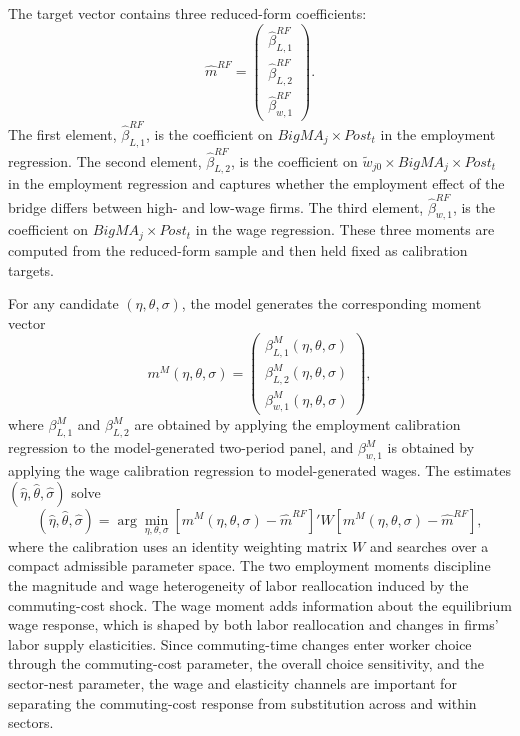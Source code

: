 \documentclass[12pt]{article}
\begin{document}
The target vector contains three reduced-form coefficients:
\begin{equation}
    \widehat{m}^{RF}
    =
    \begin{pmatrix}
        \widehat{\beta}^{RF}_{L,1} \\
        \widehat{\beta}^{RF}_{L,2} \\
        \widehat{\beta}^{RF}_{w,1}
    \end{pmatrix}.
    \label{eq:calibration_target_vector}
\end{equation}
The first element, \(\widehat{\beta}^{RF}_{L,1}\), is the coefficient on \(BigMA_j\times Post_t\) in the employment regression. The second element, \(\widehat{\beta}^{RF}_{L,2}\), is the coefficient on \(\widetilde{w}_{j0}\times BigMA_j\times Post_t\) in the employment regression and captures whether the employment effect of the bridge differs between high- and low-wage firms. The third element, \(\widehat{\beta}^{RF}_{w,1}\), is the coefficient on \(BigMA_j\times Post_t\) in the wage regression. These three moments are computed from the reduced-form sample and then held fixed as calibration targets.

For any candidate \((\eta,\theta,\sigma)\), the model generates the corresponding moment vector
\begin{equation}
    m^{M}(\eta,\theta,\sigma)
    =
    \begin{pmatrix}
        \beta^{M}_{L,1}(\eta,\theta,\sigma) \\
        \beta^{M}_{L,2}(\eta,\theta,\sigma) \\
        \beta^{M}_{w,1}(\eta,\theta,\sigma)
    \end{pmatrix},
    \label{eq:calibration_model_vector}
\end{equation}
where \(\beta^{M}_{L,1}\) and \(\beta^{M}_{L,2}\) are obtained by applying the employment calibration regression to the model-generated two-period panel, and \(\beta^{M}_{w,1}\) is obtained by applying the wage calibration regression to model-generated wages. The estimates \((\widehat{\eta},\widehat{\theta},\widehat{\sigma})\) solve
\begin{equation}
    (\widehat{\eta},\widehat{\theta},\widehat{\sigma})
    =
    \arg\min_{\eta,\theta,\sigma}
    \left[
        m^{M}(\eta,\theta,\sigma)-\widehat{m}^{RF}
    \right]'
    W
    \left[
        m^{M}(\eta,\theta,\sigma)-\widehat{m}^{RF}
    \right],
    \label{eq:calibration_objective}
\end{equation}
where the calibration uses an identity weighting matrix \(W\) and searches over a compact admissible parameter space. The two employment moments discipline the magnitude and wage heterogeneity of labor reallocation induced by the commuting-cost shock. The wage moment adds information about the equilibrium wage response, which is shaped by both labor reallocation and changes in firms' labor supply elasticities. Since commuting-time changes enter worker choice through the commuting-cost parameter, the overall choice sensitivity, and the sector-nest parameter, the wage and elasticity channels are important for separating the commuting-cost response from substitution across and within sectors.
\end{document}
